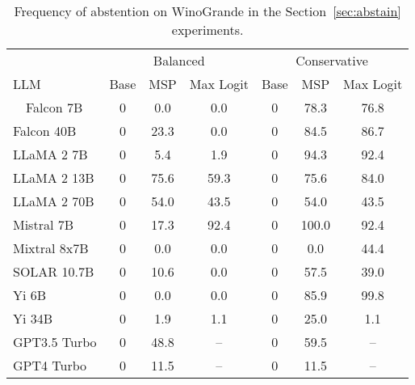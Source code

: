 \begin{table*}[h]
\centering
\caption{Frequency of abstention on WinoGrande in the Section~\ref{sec:abstain} experiments.}
\label{tab:winogrande_pct_abstained}
\begin{tabular}{lcccccc}
\toprule
& \multicolumn{3}{c}{Balanced} & \multicolumn{3}{c}{Conservative} \\ 
LLM & Base & MSP & Max Logit & Base & MSP & Max Logit \\ 
\cmidrule(lr){1-1}\cmidrule(lr){2-4}\cmidrule(lr){5-7}\ \ 
Falcon 7B & 0 & 0.0 & 0.0 & 0 & 78.3 & 76.8\\
Falcon 40B & 0 & 23.3 & 0.0 & 0 & 84.5 & 86.7\\
LLaMA 2 7B & 0 & 5.4 & 1.9 & 0 & 94.3 & 92.4\\
LLaMA 2 13B & 0 & 75.6 & 59.3 & 0 & 75.6 & 84.0\\
LLaMA 2 70B & 0 & 54.0 & 43.5 & 0 & 54.0 & 43.5\\
Mistral 7B & 0 & 17.3 & 92.4 & 0 & 100.0 & 92.4\\
Mixtral 8x7B & 0 & 0.0 & 0.0 & 0 & 0.0 & 44.4\\
SOLAR 10.7B & 0 & 10.6 & 0.0 & 0 & 57.5 & 39.0\\
Yi 6B & 0 & 0.0 & 0.0 & 0 & 85.9 & 99.8\\
Yi 34B & 0 & 1.9 & 1.1 & 0 & 25.0 & 1.1\\
GPT3.5 Turbo & 0 & 48.8 & -- & 0 & 59.5 & --\\
GPT4 Turbo & 0 & 11.5 & -- & 0 & 11.5 & --\\
\bottomrule
\end{tabular}
\end{table*}
